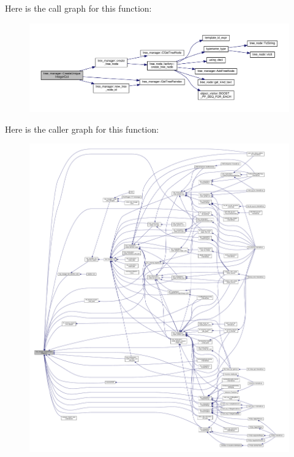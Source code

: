 Here is the call graph for this function\+:
\nopagebreak
\begin{figure}[H]
\begin{center}
\leavevmode
\includegraphics[width=350pt]{d2/ddd/classtree__manager_a45e4ad0e5ed7a544fb1527ba11bc9fb2_cgraph}
\end{center}
\end{figure}
Here is the caller graph for this function\+:
\nopagebreak
\begin{figure}[H]
\begin{center}
\leavevmode
\includegraphics[width=350pt]{d2/ddd/classtree__manager_a45e4ad0e5ed7a544fb1527ba11bc9fb2_icgraph}
\end{center}
\end{figure}
\mbox{\label{classtree__manager_abfb19a0d854ad4584c06301f693349fe}} 
